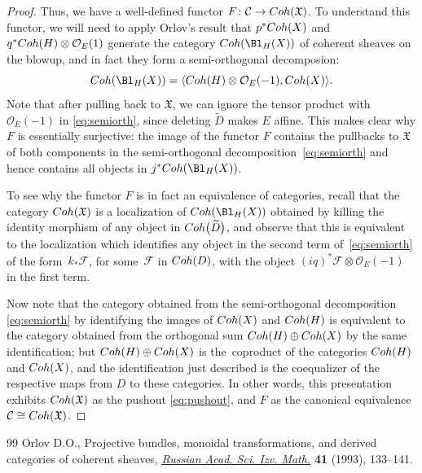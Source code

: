 \documentclass[11pt]{article}
\numberwithin{equation}{section}
\numberwithin{equation}{section}
\def\cC{\mathcal{C}}
\def\cO{\mathcal{O}}
\def\cF{\mathcal{F}}
\newcommand\frX{\mathfrak{X}}
\newcommand{\Coh}{\textup{Coh}}
\begin{document}
\begin{proof}
Thus, we have a well-defined functor $F\colon\cC\to \Coh(\frX)$.
To understand this functor,
we will need to apply
Orlov's result \cite{Orl92} that $p^*\Coh(X)$ and $q^*\Coh(H)\otimes\cO_E(1)$ generate the category $\Coh(\Bl_H(X))$ of coherent sheaves on the blowup, and in fact they form a semi-orthogonal decomposion:
\begin{equation}\label{eq:semiorth}
\Coh(\Bl_H(X)) = \langle \Coh(H)\otimes \cO_E(-1), \Coh(X)\rangle.
\end{equation}
Note that after pulling back to $\frX$, we can ignore the tensor
product with $\cO_E(-1)$ in \eqref{eq:semiorth}, since deleting $\widetilde{D}$ makes $E$ affine. This makes clear why $F$ is essentially surjective: the image of the functor $F$ contains the pullbacks to $\frX$ of both components in the semi-orthogonal decomposition~\eqref{eq:semiorth} and hence contains all objects in $j^*\Coh(\Bl_H(X))$.

To see why the functor $F$ is in fact an equivalence of categories, recall that the
category $\Coh(\frX)$ is a localization of $\Coh(\Bl_H(X))$ obtained by killing the identity morphism of any object in $\Coh\big(\widetilde{D}\big)$, and observe that this is equivalent to the localization which identifies any object in the second term of~\eqref{eq:semiorth} of the form~$k_*\cF$, for some~$\cF$ in $\Coh(D)$, with the object $(iq)^*\cF\otimes \cO_E(-1)$ in the first term.

Now note that the
category obtained from the semi-orthogonal decomposition \eqref{eq:semiorth} by identifying the images of $\Coh(X)$ and $\Coh(H)$ is equivalent to the category obtained from the ortho\-go\-nal sum $\Coh(H)\oplus \Coh(X)$ by the same identification;
but $\Coh(H)\oplus \Coh(X)$ is the~co\-pro\-duct of the categories $\Coh(H)$ and $\Coh(X)$, and the identification just described is the coequalizer of the respective maps from $D$ to these categories. In other words, this presentation exhibits $\Coh(\frX)$ as the pushout \eqref{eq:pushout}, and $F$ as the canonical equivalence $\cC\cong \Coh(\frX)$.
\end{proof}
\begin{thebibliography}{99}
Orlov D.O., Projective bundles, monoidal transformations, and derived
 categories of coherent sheaves, \href{https://doi.org/10.1070/IM1993v041n01ABEH002182}{\textit{Russian Acad. Sci. Izv. Math.}}
 \textbf{41} (1993), 133--141.

\end{thebibliography}
\end{document}
